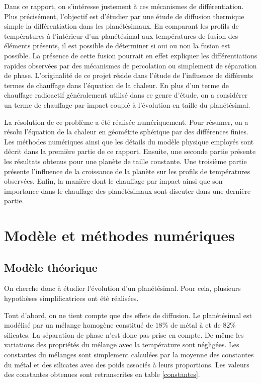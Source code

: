 \documentclass[10pt,a4paper]{article}
\numberwithin{equation}{section}
\begin{document}
Dans ce rapport, on s'intéresse justement à ces mécanismes de différentiation. Plus précisément, l'objectif est d'étudier par une étude de diffusion thermique simple la différentiation dans les planétésimaux. En comparant les profils de températures à l'intérieur d'un planétésimal aux températures de fusion des éléments présents, il est possible de déterminer si oui ou non la fusion est possible. La présence de cette fusion pourrait en effet expliquer les différentiations rapides observées par des mécanismes de percolation ou simplement de séparation de phase. 
L'originalité de ce projet réside dans l'étude de l'influence de différents termes de chauffage dans l'équation de la chaleur. En plus d'un terme de chauffage radioactif généralement utilisé dans ce genre d'étude, on a considérer un terme de chauffage par impact couplé à l'évolution en taille du planétésimal.
\medskip

La résolution de ce problème a été réalisée numériquement. Pour résumer, on a résolu l'équation de la chaleur en géométrie sphérique par des différences finies. Les méthodes numériques ainsi que les détails du modèle physique employés sont décrit dans la première partie de ce rapport. Ensuite, une seconde partie présente les résultats obtenus pour une planète de taille constante. Une troisième partie présente l'influence de la croissance de la planète sur les profils de températures observées. Enfin, la manière dont le chauffage par impact ainsi que son importance dans le chauffage des planétésimaux sont discuter dans une dernière partie.

\section{Modèle et méthodes numériques}
\subsection{Modèle théorique}

On cherche donc à étudier l'évolution d'un planétésimal. Pour cela, plusieurs hypothèses simplificatrices ont été réalisées. 
\medskip

Tout d'abord, on ne tient compte que des effets de diffusion. Le planétésimal est modélisé par un mélange homogène constitué de $18\%$ de métal à et de $82\%$ silicates. La séparation de phase n'est donc pas prise en compte. De même les variations des propriétés du mélange avec la température sont négligées. Les constantes du mélanges sont simplement calculées par la moyenne des constantes du métal et des silicates avec des poids associés à leurs proportions. Les valeurs des constantes obtenues sont retranscrites en table \ref{constantes}.
\medskip
\end{document}
